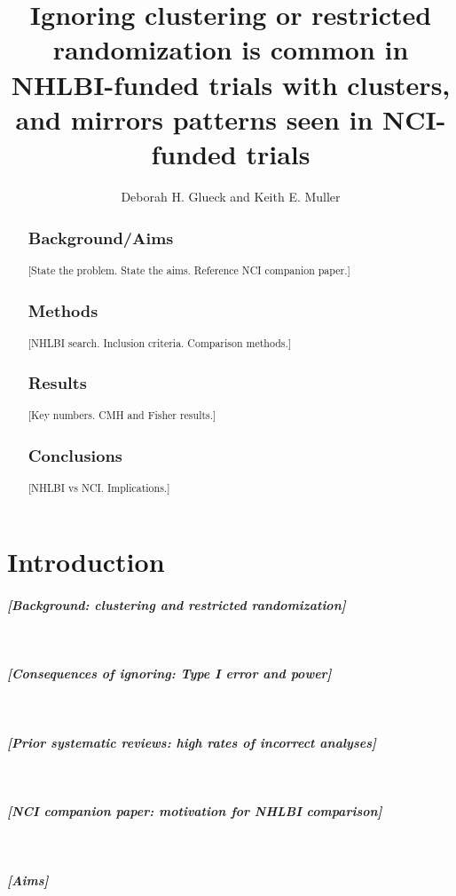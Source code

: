 \documentclass{article}
\newcommand{\outline}[1]{\paragraph{\textit{[#1]}}\mbox{}\\}
\begin{document}
\doublespacing

\title{Ignoring clustering or restricted randomization is common in NHLBI-funded trials with clusters, and mirrors patterns seen in NCI-funded trials}
\author{Deborah H. Glueck and Keith E. Muller}
\date{}
\maketitle

\begin{abstract}
\subsection*{Background/Aims}
[State the problem. State the aims. Reference NCI companion paper.]

\subsection*{Methods}
[NHLBI search. Inclusion criteria. Comparison methods.]

\subsection*{Results}
[Key numbers. CMH and Fisher results.]

\subsection*{Conclusions}
[NHLBI vs NCI. Implications.]
\end{abstract}

\newpage

\section{Introduction}

\outline{Background: clustering and restricted randomization}

\outline{Consequences of ignoring: Type I error and power}

\outline{Prior systematic reviews: high rates of incorrect analyses}

\outline{NCI companion paper: motivation for NHLBI comparison}

\outline{Aims}

\end{document}
